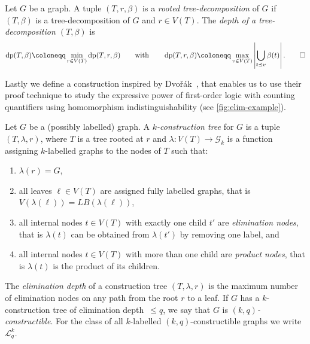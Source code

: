 \documentclass{lmcs}
\theoremstyle{plain}\newtheorem{claim}[thm]{Claim}   %
\newcommand{\cG}{\ensuremath{\mathcal G}}
\newcommand{\cL}{\ensuremath{\mathcal L}}
\DeclareMathOperator{\dep}{dp}
\newcommand{\Lkq}{\ensuremath{\cL_{q}^{k}}}
\newcommand{\elimOrd}[2]{$(#1,#2)$-constructible}
\newcommand{\elimDepth}{elimination depth}
\newcommand{\labels}[1]{\ensuremath{LB(#1)}}
\begin{document}
\begin{defi}
	\label{def:depth-treedec}
	Let $G$ be a graph.
	A tuple $(T,r,\beta)$ is a \emph{rooted tree-decomposition} of $G$
	if $(T,\beta)$ is a tree-decomposition of $G$ and $r \in V(T)$.
	The \emph{depth of a tree-decomposition $(T,\beta)$} is
	\begin{equation*}
		\dep(T,\beta)\coloneqq \min_{r\in V(T)} \dep(T,r,\beta)
		\qquad \text{with}
		\qquad
		\dep(T,r,\beta)\coloneqq \max_{v \in V(T)} \left| \bigcup_{t\preceq v} \beta(t) \right|.\qedhere
	\end{equation*}
\end{defi}

Lastly we define a construction inspired by Dvo\v{r}\'ak~\cite{Dvorak_recognizing_2010}, that enables us to use their proof technique to study the expressive power of first-order logic with counting quantifiers using homomorphism indistinguishability (see \autoref{fig:elim-example}).

\begin{defi}
	\label{def:Ekq}
	Let $G$ be a (possibly labelled) graph. A \emph{$k$-construction tree} for $G$ is a tuple $(T,\lambda,r)$, where $T$ is a tree rooted at $r$ and $\lambda\colon V(T)\rightarrow \cG_k$ is a function assigning $k$-labelled graphs to the nodes of $T$ such that:
	\begin{enumerate}[label=(CT.\arabic*), labelindent=0pt, itemindent=*, leftmargin=*]
		\item $\lambda(r)=G$, \label{ct1}
		\item all leaves $\ell\in V(T)$ are assigned fully labelled graphs, that is $V(\lambda(\ell))=\labels{\lambda(\ell)}$,
		\item all internal nodes $t\in V(T)$ with exactly one child $t'$ are \emph{elimination nodes}, that is $\lambda(t)$ can be obtained from $\lambda(t')$ by removing one label, and
		\item all internal nodes $t\in V(T)$ with more than one child are \emph{product nodes}, that is $\lambda(t)$ is the product of its children.
	\end{enumerate}
	The \emph{\elimDepth} of a construction tree $(T,\lambda,r)$ is the maximum number of elimination nodes on any path from the root $r$ to a leaf.
	If $G$ has a $k$-construction tree of \elimDepth\ $\leq q$, we say that $G$ is \emph{\elimOrd{k}{q}}.
	For the class of all $k$-labelled \elimOrd{k}{q} graphs we write \Lkq.
\end{defi}
\end{document}
